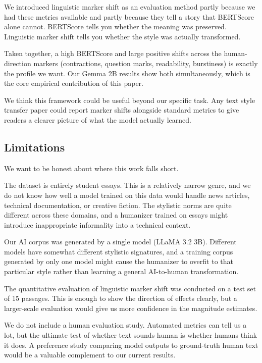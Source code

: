\documentclass{article}
\begin{document}
We introduced linguistic marker shift as an evaluation method partly because we had these metrics available and partly because they tell a story that BERTScore alone cannot. BERTScore tells you whether the meaning was preserved. Linguistic marker shift tells you whether the style was actually transformed.

Taken together, a high BERTScore and large positive shifts across the human-direction markers (contractions, question marks, readability, burstiness) is exactly the profile we want. Our Gemma 2B results show both simultaneously, which is the core empirical contribution of this paper.

We think this framework could be useful beyond our specific task. Any text style transfer paper could report marker shifts alongside standard metrics to give readers a clearer picture of what the model actually learned.

\subsection{Limitations}

We want to be honest about where this work falls short.

The dataset is entirely student essays. This is a relatively narrow genre, and we do not know how well a model trained on this data would handle news articles, technical documentation, or creative fiction. The stylistic norms are quite different across these domains, and a humanizer trained on essays might introduce inappropriate informality into a technical context.

Our AI corpus was generated by a single model (LLaMA 3.2 3B). Different models have somewhat different stylistic signatures, and a training corpus generated by only one model might cause the humanizer to overfit to that particular style rather than learning a general AI-to-human transformation.

The quantitative evaluation of linguistic marker shift was conducted on a test set of 15 passages. This is enough to show the direction of effects clearly, but a larger-scale evaluation would give us more confidence in the magnitude estimates.

We do not include a human evaluation study. Automated metrics can tell us a lot, but the ultimate test of whether text sounds human is whether humans think it does. A preference study comparing model outputs to ground-truth human text would be a valuable complement to our current results.
\end{document}

